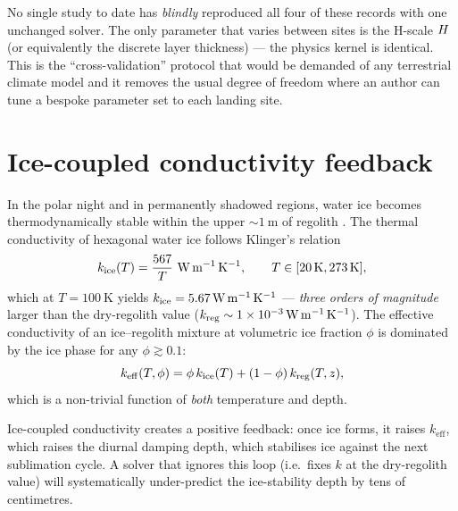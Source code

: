 \begin{novelty}
No single study to date has \emph{blindly} reproduced all four of
these records with one unchanged solver.  The only parameter that
varies between sites is the H-scale $H$ (or equivalently the
discrete layer thickness) --- the physics kernel is identical.  This is
the ``cross-validation'' protocol that would be demanded of any
terrestrial climate model and it removes the usual degree of freedom
where an author can tune a bespoke parameter set to each landing site.
\end{novelty}

\section{Ice-coupled conductivity feedback}
\label{sec:novelty-ice}

In the polar night and in permanently shadowed regions, water ice
becomes thermodynamically stable within the upper ${\sim}\SI{1}{\meter}$
of regolith \citep{paige2010,schorghofer2020}.  The thermal
conductivity of hexagonal water ice follows Klinger's relation
\citep{klinger1980}
\begin{equation}
  k_{\mathrm{ice}}(T) = \frac{567}{T}\ \si{\watt\per\meter\per\kelvin},
  \qquad T \in [\SI{20}{\kelvin},\SI{273}{\kelvin}],
  \label{eq:klinger}
\end{equation}
which at $T=\SI{100}{\kelvin}$ yields
$k_{\mathrm{ice}} = \SI{5.67}{\watt\per\meter\per\kelvin}$ --- \emph{three orders
of magnitude} larger than the dry-regolith value
($k_{\mathrm{reg}} \sim \SI{1e-3}{\watt\per\meter\per\kelvin}$).  The effective
conductivity of an ice--regolith mixture at volumetric ice fraction
$\phi$ is dominated by the ice phase for any $\phi \gtrsim 0.1$:
\begin{equation}
  k_{\mathrm{eff}}(T,\phi) =
  \phi\,k_{\mathrm{ice}}(T) + (1-\phi)\,k_{\mathrm{reg}}(T,z),
  \label{eq:k_mix}
\end{equation}
which is a non-trivial function of \emph{both} temperature and depth.

\begin{concept}
Ice-coupled conductivity creates a positive feedback: once ice forms, it
raises $k_{\mathrm{eff}}$, which raises the diurnal damping depth,
which stabilises ice against the next sublimation cycle.  A solver that
ignores this loop (i.e.\ fixes $k$ at the dry-regolith value) will
systematically under-predict the ice-stability depth by tens of
centimetres.
\end{concept}

